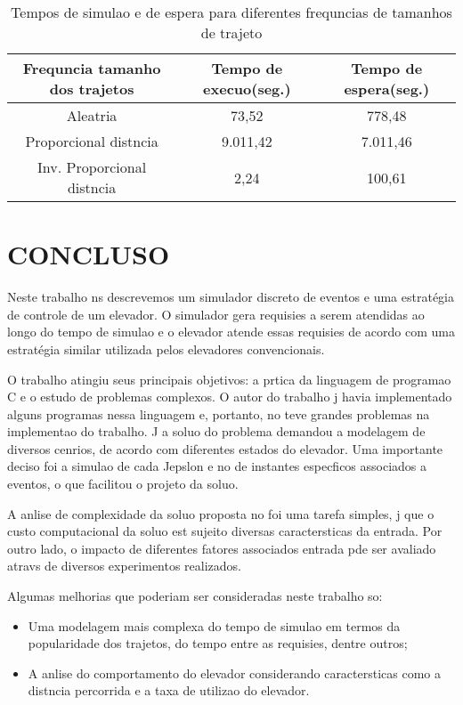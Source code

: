 \documentclass[12pt]{article}
\begin{document}
\begin{table}[ht!]
\centering
\begin{footnotesize}
\begin{tabular}{|c|c|c|}
\hline
\textbf{Frequncia tamanho dos trajetos}              & \textbf{Tempo de execuo(seg.)}      & \textbf{Tempo de espera(seg.)} \\ \hline
Aleatria			& 73,52	& 778,48	\\ \hline
Proporcional  distncia	& 9.011,42	& 7.011,46	\\ \hline
Inv. Proporcional  distncia	& 2,24	& 100,61	\\ \hline
\end{tabular}
\end{footnotesize}
\caption{Tempos de simulao e de espera para diferentes frequncias de tamanhos de trajeto \label{tempos_freq_trajetos}}
\end{table}

\section{CONCLUSO}
\label{conclusao}


Neste trabalho ns descrevemos um simulador discreto de eventos e uma estratégia de controle de um elevador. O simulador gera requisies a serem atendidas ao longo do tempo de simulao e o elevador atende  essas requisies de acordo com uma estratégia similar  utilizada pelos elevadores convencionais.

O trabalho atingiu seus principais objetivos: a prtica da linguagem de programao C e o estudo de problemas complexos. O autor do trabalho j havia implementado alguns programas nessa linguagem e, portanto, no teve grandes problemas na implementao do trabalho. J a soluo do problema demandou a modelagem de diversos cenrios, de acordo com diferentes estados do elevador. Uma importante deciso foi a simulao de cada Jepslon e no de instantes especficos associados a eventos, o que facilitou o projeto da soluo.

A anlise de complexidade da soluo proposta no foi uma tarefa simples, j que o custo computacional da soluo est sujeito  diversas caractersticas da entrada. Por outro lado, o impacto de diferentes fatores associados  entrada pde ser avaliado atravs de diversos experimentos realizados.

Algumas melhorias que poderiam ser consideradas neste trabalho so:
\begin{itemize}
\item Uma modelagem mais complexa do tempo de simulao em termos da popularidade dos trajetos, do tempo entre as requisies, dentre outros;
\item A anlise do comportamento do elevador considerando caractersticas como a distncia percorrida e a taxa de utilizao do elevador.
\end{itemize}


\end{document}
